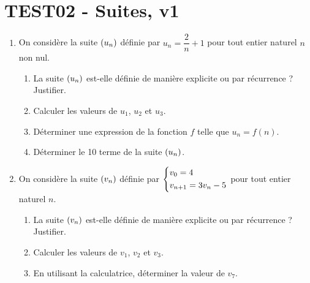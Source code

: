 \documentclass[a4paper,11pt]{article}
\author{Pierquet}
\title{\nomfichier}
\begin{document}
\pagestyle{fancy}

\part{TEST02 - Suites, v1}

\medskip

\nomprenomtcbox

\begin{enumerate}
	\item On considère la suite $\suiten$ définie par $u_n = \dfrac{2}{n}+1$ pour tout entier naturel $n$ non nul.
	\begin{enumerate}
		\item La suite $\suiten$ est-elle définie de manière explicite ou par récurrence ? Justifier.
		
		
		\item Calculer les valeurs de $u_1$, $u_2$ et $u_3$.
		
		
		\item Déterminer une expression de la fonction $f$ telle que $u_n=f(n)$.
		
		
		\item Déterminer le 10\ieme{} terme de la suite $\suiten$.
		
	\end{enumerate}
	\item On considère la suite $\suiten[v]$ définie par $\begin{dcases} v_0 = 4 \\ v_{n+1}=3v_n-5 \end{dcases}$ pour tout entier naturel $n$.
	\begin{enumerate}
		\item La suite $\suiten[v]$ est-elle définie de manière explicite ou par récurrence ? Justifier.
		
		
		\item Calculer les valeurs de $v_1$, $v_2$ et $v_3$.
		
		
		\item En utilisant la calculatrice, déterminer la valeur de $v_{7}$.
		
		
	\end{enumerate}
\end{enumerate}
\end{document}
